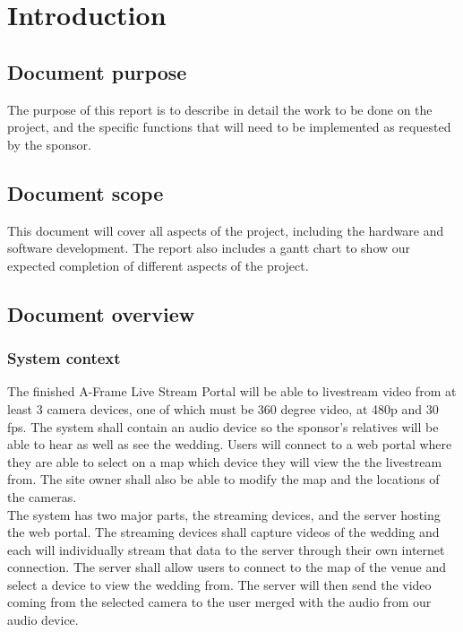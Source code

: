 \documentclass[onecolumn, draftclsnofoot,10pt, compsoc]{IEEEtran}
\begin{document}
\section{Introduction}
    \subsection{Document purpose}
    The purpose of this report is to describe in detail the work to be done on the project, and the specific functions that will need to be implemented as requested by the sponsor.

    \subsection{Document scope}
    This document will cover all aspects of the project, including the hardware and software development.
    The report also includes a gantt chart to show our expected completion of different aspects of the project.
    
    \subsection{Document overview}
        \subsubsection{System context}
        The finished A-Frame Live Stream Portal will be able to livestream video from at least 3 camera devices, one of which must be 360 degree video, at 480p and 30 fps. 
        The system shall contain an audio device so the sponsor's relatives will be able to hear as well as see the wedding. 
        Users will connect to a web portal where they are able to select on a map which device they will view the the livestream from. 
        The site owner shall also be able to modify the map and the locations of the cameras.
    \\
        The system has two major parts, the streaming devices, and the server hosting the web portal. 
        The streaming devices shall capture videos of the wedding and each will individually stream that data to the server through their own internet connection. 
        The server shall allow users to connect to the map of the venue and select a device to view the wedding from. 
        The server will then send the video coming from the selected camera to the user merged with the audio from our audio device.
        
\end{document}
